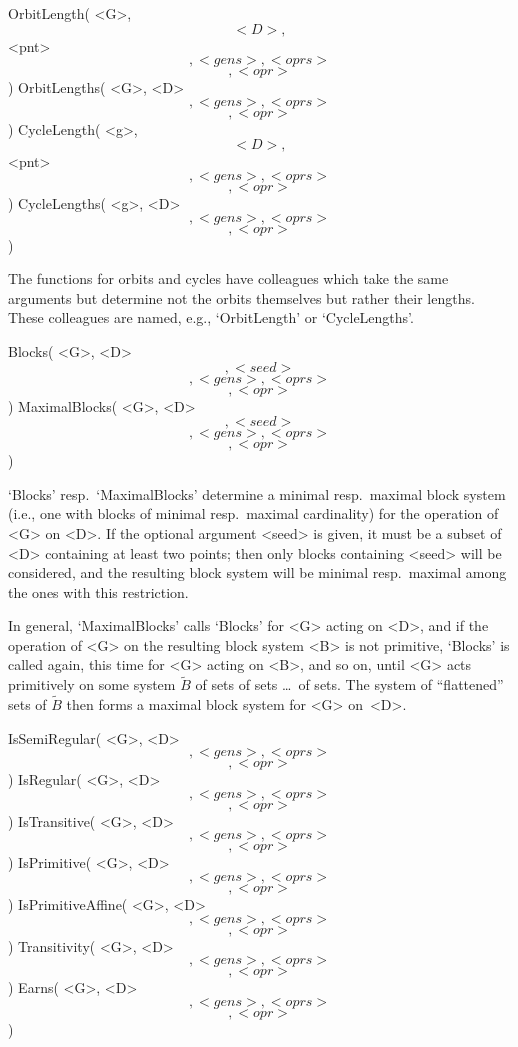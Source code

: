 \>OrbitLength( <G>, \[ <D>, \] <pnt> \[, <gens>, <oprs> \] \[, <opr> \] )
\>OrbitLengths( <G>, <D> \[, <gens>, <oprs> \] \[, <opr> \] )
%
\>CycleLength( <g>, \[ <D>, \] <pnt> \[, <gens>, <oprs> \] \[, <opr> \] )
\>CycleLengths( <g>, <D> \[, <gens>, <oprs> \] \[, <opr> \] )

The functions  for orbits and cycles  have colleagues which take the same
arguments but   determine  not the orbits   themselves  but rather  their
lengths.    These   colleagues   are   named,   e.g.,   `OrbitLength'  or
`CycleLengths'.

\>Blocks( <G>, <D> \[, <seed> \] \[, <gens>, <oprs> \] \[, <opr> \] )
\>MaximalBlocks( <G>, <D> \[, <seed> \] \[, <gens>, <oprs> \] %
                 \[, <opr> \] )

`Blocks'  resp.~`MaximalBlocks'  determine a minimal  resp.~maximal block
system  (i.e., one with blocks  of minimal resp.~maximal cardinality) for
the operation of <G> on <D>. If the optional argument <seed> is given, it
must be a subset of <D> containing at least  two points; then only blocks
containing <seed> will be considered, and the resulting block system will
be minimal resp.~maximal among the ones with this restriction.

In general, `MaximalBlocks' calls `Blocks' for  <G> acting on <D>, and if
the operation of <G> on the resulting  block system <B> is not primitive,
`Blocks'  is called again, this  time for <G> acting   on <B>, and so on,
until <G> acts  primitively  on some system $\tilde   B$ of sets of  sets
\dots\ of sets. The system of ``flattened'' sets of $\tilde B$ then forms
a maximal block system for <G> on~<D>.

\>IsSemiRegular( <G>, <D> \[, <gens>, <oprs> \] \[, <opr> \] )
%
\>IsRegular( <G>, <D> \[, <gens>, <oprs> \] \[, <opr> \] )
%
\>IsTransitive( <G>, <D> \[, <gens>, <oprs> \] \[, <opr> \] )
%
\>IsPrimitive( <G>, <D> \[, <gens>, <oprs> \] \[, <opr> \] )
%
\>IsPrimitiveAffine( <G>, <D> \[, <gens>, <oprs> \] \[, <opr> \] )
\endgraf\smallskip%
\>Transitivity( <G>, <D> \[, <gens>, <oprs> \] \[, <opr> \] )
%
\>Earns( <G>, <D> \[, <gens>, <oprs> \] \[, <opr> \] )
%

